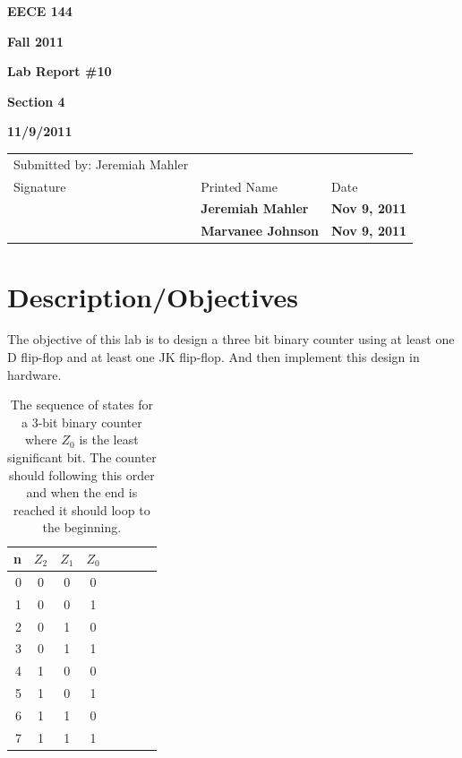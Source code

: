 \documentclass[12pt]{article}
\begin{document}
\centerline{\bf EECE 144}
\centerline{\bf Fall 2011}
\centerline{\bf}
\centerline{\bf Lab Report \#10}
\centerline{\bf Section 4}
\centerline{\bf 11/9/2011}
\begin{center}
\begin{tabularx}{\textwidth}[b]{X l l}
Submitted by: Jeremiah Mahler & & \\
Signature & Printed Name & Date \\
\hline
\multicolumn{1}{|X|}{} & \multicolumn{1}{|l|}{\bigstrut \bf Jeremiah Mahler} & \multicolumn{1}{|l|}{\bf Nov 9, 2011} \\
\hline
\multicolumn{1}{|X|}{} & \multicolumn{1}{|l|}{\bigstrut \bf Marvanee Johnson} & \multicolumn{1}{|l|}{\bf Nov 9, 2011} \\
\hline
\end{tabularx}
\end{center}

\section{Description/Objectives}

The objective of this lab is to design a three bit binary counter
using at least one D flip-flop and at least one JK flip-flop.
And then implement this design in hardware.

\begin{table}[hbp]
\begin{center}
\begin{tabular}[t]{r|cccc|ccc}
n & $Z_2$ & $Z_1$ & $Z_0$ \\
\hline
0 & 0 & 0 & 0 \\
1 & 0 & 0 & 1 \\
2 & 0 & 1 & 0 \\
3 & 0 & 1 & 1 \\
4 & 1 & 0 & 0 \\
5 & 1 & 0 & 1 \\
6 & 1 & 1 & 0 \\
7 & 1 & 1 & 1 \\
\end{tabular}
\end{center}
\caption{The sequence of states for a 3-bit binary counter
where $Z_0$ is the least significant bit.
The counter should following this order and when the end is reached
it should loop to the beginning.}
\label{tbl:tt}
\end{table}

\end{document}
